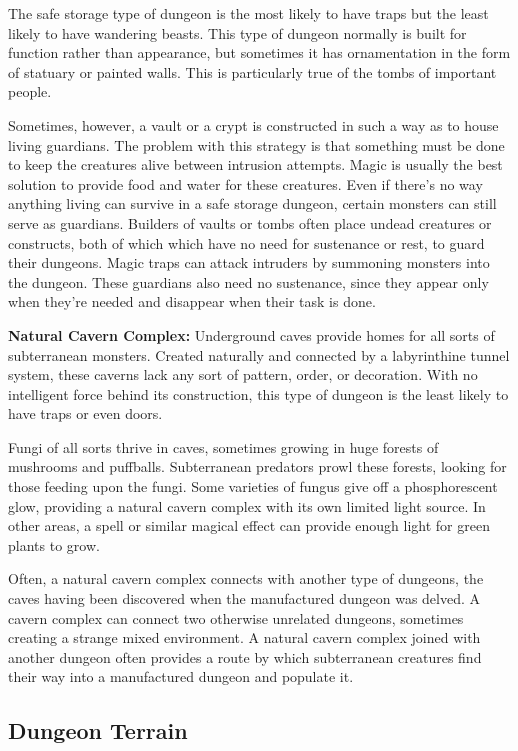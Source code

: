 The safe storage type of dungeon is the most likely to have traps but the least 
likely to have wandering beasts. This type of dungeon normally is built for function 
rather than appearance, but sometimes it has ornamentation in the form of statuary 
or painted walls. This is particularly true of the tombs of important people.

Sometimes, however, a vault or a crypt is constructed in such a way as to house 
living guardians. The problem with this strategy is that something must be done 
to keep the creatures alive between intrusion attempts. Magic is usually the best 
solution to provide food and water for these creatures. Even if there's no way 
anything living can survive in a safe storage dungeon, certain monsters can still 
serve as guardians. Builders of vaults or tombs often place undead creatures or 
constructs, both of which which have no need for sustenance or rest, to guard their 
dungeons. Magic traps can attack intruders by summoning monsters into the dungeon. 
These guardians also need no sustenance, since they appear only when they're needed 
and disappear when their task is done.

\textbf{Natural Cavern Complex:} Underground caves provide homes for all sorts 
of subterranean monsters. Created naturally and connected by a labyrinthine tunnel 
system, these caverns lack any sort of pattern, order, or decoration. With no intelligent 
force behind its construction, this type of dungeon is the least likely to have 
traps or even doors.

Fungi of all sorts thrive in caves, sometimes growing in huge forests of mushrooms 
and puffballs. Subterranean predators prowl these forests, looking for those feeding 
upon the fungi. Some varieties of fungus give off a phosphorescent glow, providing 
a natural cavern complex with its own limited light source. In other areas, a 
spell or similar magical effect can provide enough light for green plants to grow.

Often, a natural cavern complex connects with another type of dungeons, the caves 
having been discovered when the manufactured dungeon was delved. A cavern complex 
can connect two otherwise unrelated dungeons, sometimes creating a strange mixed 
environment. A natural cavern complex joined with another dungeon often provides 
a route by which subterranean creatures find their way into a manufactured dungeon 
and populate it.

\subsection{Dungeon Terrain}

